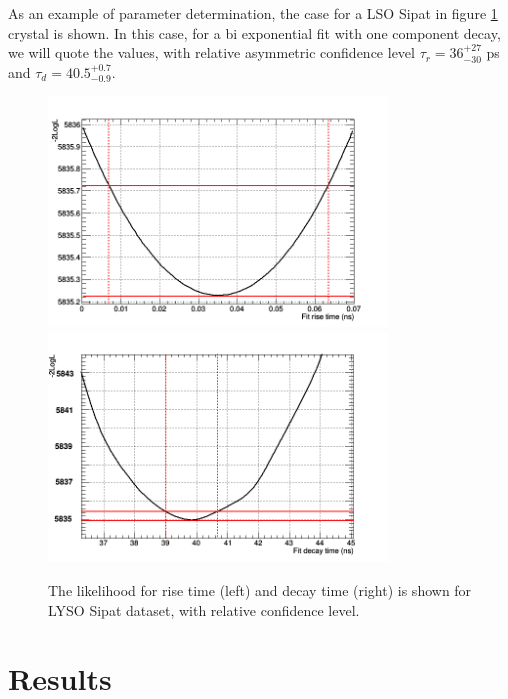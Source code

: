 As an example of parameter determination, the case for a LSO Sipat in figure \ref{fig:likelihood_sipat} crystal is shown. In this case, for a bi exponential fit with one component decay, we will quote the values, with relative asymmetric confidence level $\tau _{r} = 36_{-30}^{+27}$ ps and $\tau _{d}= 40.5_{-0.9}^{+0.7}$.
\begin{figure}[htbp]
\begin{center}
\includegraphics[width=9cm]{../Pictures/Chapter_7/rise_sipat.png}
\includegraphics[width=9cm]{../Pictures/Chapter_7/decay_like_2.png}
\end{center}
\caption[Likelihood for Sipat LYSO]{The likelihood for rise time (left) and decay time (right) is shown for LYSO Sipat dataset, with relative confidence level.}
\label{fig:likelihood_sipat}
\end{figure}

\section{Results}
